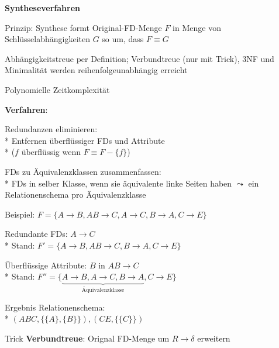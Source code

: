 \newpage

\textbf{Syntheseverfahren}
\begin{items}
	\item Prinzip: Synthese formt Original-FD-Menge \( F \) in Menge von Schlüsselabhängigkeiten \( G \) so um, dass \( F \equiv G \)
	\item Abhängigkeitstreue per Definition; Verbundtreue (nur mit Trick), 3NF und Minimalität werden reihenfolgeunabhängig erreicht
	\item Polynomielle Zeitkomplexität
	\item \textbf{Verfahren}:
	\begin{enumeration}
		\item Redundanzen eliminieren: \\*
		Entfernen überflüssiger FDs und Attribute \\*
		(\( f \) überflüssig wenn \( F \equiv F - \{  f \} \))
		\item FDs zu Äquivalenzklassen zusammenfassen: \\*
		FDs in selber Klasse, wenn sie äquivalente linke Seiten haben \( \leadsto \) ein Relationenschema pro Äquivalenzklasse
	\end{enumeration}
	\item Beispiel: \( F = \{ A \to B, AB \to C, A \to C, B \to A, C \to E \} \)
	\begin{enumeration}
		\item Redundante FDs: \( A \to C \) \\* Stand: \( F' = \{ A \to B, AB \to C, B \to A, C \to E \} \)
		\item Überflüssige Attribute: \( B \) in \( AB \to C \) \\* Stand: \( F'' = \{ \underbrace{A \to B, A \to C, B \to A}_{\text{Äquivalenzklasse}}, C \to E \} \)
		\item Ergebnis Relationenschema: \\* \( (ABC, \{ \{ A \}, \{ B \} \}), (CE, \{ \{ C \} \}) \)
	\end{enumeration}

	\item Trick \textbf{Verbundtreue}: Orignal FD-Menge um $R \to \delta$ erweitern
\end{items}

